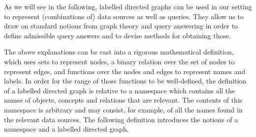 As we will see in the following, labelled directed graphs can be used in our setting
to represent (combinations of) data sources as well as queries.
They allow us to draw on standard notions from graph theory and query answering
in order to define admissible query answers and to devise methods for obtaining those.


The above explanations can be cast into a rigorous mathematical definition,
which uses sets to represent nodes, a binary relation over the set of nodes
to represent edges, and functions over the nodes and edges to represent
names and labels. In order for the range of those functions to be well-defined,
the definition of a labelled directed graph is relative to a namespace which
contains all the names of objects, concepts and relations that are relevant.
The contents of this namespace is arbitrary and may consist,
for example, of all the names found in the relevant data sources.
The following definition introduces the notions of a namespace and a
labelled directed graph.
%
%
